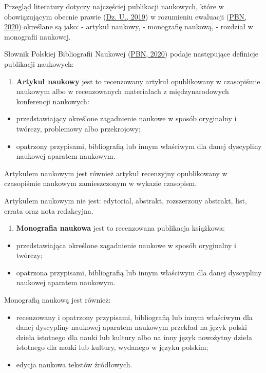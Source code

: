 \documentclass[
  12pt,
]{article}
\providecommand{\tightlist}{%
  \setlength{\itemsep}{0pt}\setlength{\parskip}{0pt}}
\begin{document}
Przegląd literatury dotyczy najczęściej publikacji naukowych, które w
obowiązującym obecnie prawie (\protect\hyperlink{ref-dz.u.2019}{Dz. U.,
2019}) w rozumieniu ewaluacji (\protect\hyperlink{ref-pbn2020}{PBN,
2020}) określane są jako: - artykuł naukowy, - monografię naukową, -
rozdział w monografii naukowej.

Słownik Polskiej Bibliografii Naukowej
(\protect\hyperlink{ref-pbn2020}{PBN, 2020}) podaje następujące
definicje publikacji naukowych:

\begin{enumerate}
\def\labelenumi{\arabic{enumi}.}
\tightlist
\item
  \textbf{Artykuł naukowy} jest to recenzowany artykuł opublikowany w
  czasopiśmie naukowym albo w recenzowanych materiałach z
  międzynarodowych konferencji naukowych:
\end{enumerate}

\begin{itemize}
\tightlist
\item
  przedstawiający określone zagadnienie naukowe w sposób oryginalny i
  twórczy, problemowy albo przekrojowy;
\item
  opatrzony przypisami, bibliografią lub innym właściwym dla danej
  dyscypliny naukowej aparatem naukowym.
\end{itemize}

Artykułem naukowym jest również artykuł recenzyjny opublikowany w
czasopiśmie naukowym zamieszczonym w wykazie czasopism.

Artykułem naukowym nie jest: edytorial, abstrakt, rozszerzony abstrakt,
list, errata oraz nota redakcyjna.

\begin{enumerate}
\def\labelenumi{\arabic{enumi}.}
\setcounter{enumi}{1}
\tightlist
\item
  \textbf{Monografia naukowa} jest to recenzowana publikacja książkowa:
\end{enumerate}

\begin{itemize}
\tightlist
\item
  przedstawiająca określone zagadnienie naukowe w sposób oryginalny i
  twórczy;
\item
  opatrzona przypisami, bibliografią lub innym właściwym dla danej
  dyscypliny naukowej aparatem naukowym.
\end{itemize}

Monografią naukową jest również:

\begin{itemize}
\tightlist
\item
  recenzowany i opatrzony przypisami, bibliografią lub innym właściwym
  dla danej dyscypliny naukowej aparatem naukowym przekład na język
  polski dzieła istotnego dla nauki lub kultury albo na inny język
  nowożytny dzieła istotnego dla nauki lub kultury, wydanego w języku
  polskim;
\item
  edycja naukowa tekstów źródłowych.
\end{itemize}
\end{document}
